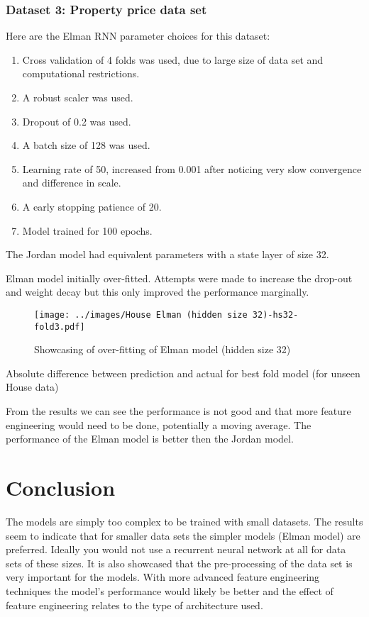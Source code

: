 \documentclass[conference]{IEEEtran}
\begin{document}
\subsubsection{Dataset 3: Property price data set}

Here are the Elman RNN parameter choices for this dataset:

\begin{enumerate}[]
	\item Cross validation of 4 folds was used, due to large size of data set and computational restrictions.
	\item A robust scaler was used.
	\item Dropout of 0.2 was used.
	\item A batch size of 128 was used.
	\item Learning rate of 50, increased from 0.001 after noticing very slow convergence and difference in scale.
	\item A early stopping patience of 20.
	\item Model trained for 100 epochs.
\end{enumerate}

The Jordan model had equivalent parameters with a state layer of size 32.

Elman model initially over-fitted. Attempts were made to increase the drop-out and weight decay but this only improved the performance marginally.

\begin{figure}[H] 
	\centering
	\texttt{[image: ../images/House Elman (hidden size 32)-hs32-fold3.pdf]}
	\caption{Showcasing of over-fitting of Elman model (hidden size 32)}
	\label{fig:overfit-elman-prop}
\end{figure}

\begin{table}[htbp]
	\caption{Absolute difference between prediction and actual for best fold model (for unseen House data)}
	\label{tab:house-rnn-summary}
\end{table}

From the results we can see the performance is not good and that more feature engineering would need to be done, potentially a moving average. The performance of the Elman model is better then the Jordan model.

\section{Conclusion}

The models are simply too complex to be trained with small datasets. The results seem to indicate that for smaller data sets the simpler models (Elman model) are preferred. Ideally you would not use a recurrent neural network at all for data sets of these sizes. It is also showcased that the pre-processing of the data set is very important for the models. With more advanced feature engineering techniques the model's performance would likely be better and the effect of feature engineering relates to the type of architecture used. 
\end{document}
